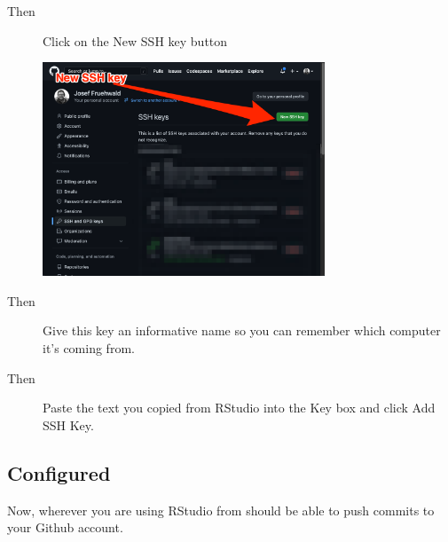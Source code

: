 \documentclass[
  letterpaper,
  DIV=11,
  numbers=noendperiod]{scrartcl}
\begin{document}
\begin{tcolorbox}[enhanced jigsaw, leftrule=.75mm, colback=white, left=2mm, bottomrule=.15mm, rightrule=.15mm, breakable, arc=.35mm, opacityback=0, colframe=quarto-callout-tip-color-frame, toprule=.15mm]
\begin{figure}[H]
{}

\end{figure}

\begin{description}
\item[Then]
Click on the New SSH key button
\end{description}

\begin{figure}[H]

{\centering \includegraphics[width=0.75\textwidth,height=\textheight]{github_onboarding_assets/new_ssh_key.png}

}

\end{figure}

\begin{description}
\item[Then]
Give this key an informative name so you can remember which computer
it's coming from.
\item[Then]
Paste the text you copied from RStudio into the Key box and click Add
SSH Key.
\end{description}

\end{tcolorbox}

\hypertarget{configured}{%
\subsection{Configured}\label{configured}}

Now, wherever you are using RStudio from should be able to push commits
to your Github account.
\end{document}
